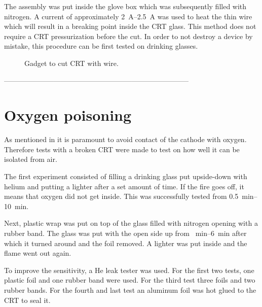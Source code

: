 The assembly was put inside the glove box which was subsequently filled with nitrogen. A current of approximately \SIrange{2}{2.5}{\ampere} was used to heat the thin wire which will result in a breaking point inside the CRT glass. This method does not require a CRT pressurization before the cut. In order to not destroy a device by mistake, this procedure can be first tested on drinking glasses.

\begin{figure}[h]
	
	\caption{Gadget to cut CRT with wire.}
	\label{fig:Gadget to cut CRT with wire}
\end{figure}

------------------------------------------------------------------------------

\section{Oxygen poisoning}
\label{sec:Oxygen poisoning}


As mentioned in  it is paramount to avoid contact of the cathode with oxygen. Therefore tests with a broken CRT were made to test on how well it can be isolated from air.

The first experiment consisted of filling a drinking glass put upside-down with helium and putting a lighter after a set amount of time. If the fire goes off, it means that oxygen did not get inside. This was successfully tested from \SIrange{0.5}{10}{\minute}.

Next, plastic wrap was put on top of the glass filled with nitrogen opening with a rubber band. The glass was put with the open side up from \SIrange{}{6}{\minute} after which it turned around and the foil removed. A lighter was put inside and the flame went out again.

To improve the sensitivity, a He leak tester was used. For the first two tests, one plastic foil and one rubber band were used. For the third test three foils and two rubber bands. For the fourth and last test an aluminum foil was hot glued to the CRT to seal it.

